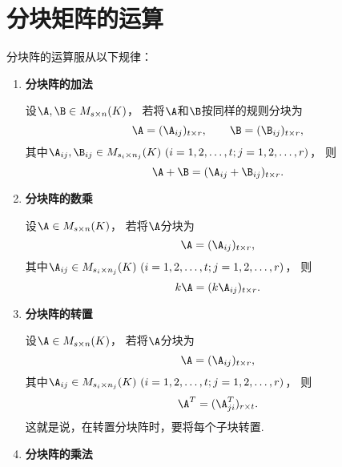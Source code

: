 \section{分块矩阵的运算}
分块阵的运算服从以下规律：
\begin{enumerate}
	\item {\rm\bf 分块阵的加法}

	设\(\A,\B \in M_{s \times n}(K)\)，
	若将\(\A\)和\(\B\)按同样的规则分块为\[
		\A=(\A_{ij})_{t \times r}, \qquad
		\B=(\B_{ij})_{t \times r},
	\]
	其中\(\A_{ij},\B_{ij}\in M_{s_i \times n_j}(K)\ (i=1,2,\dotsc,t;j=1,2,\dotsc,r)\)，
	则\[
		\A+\B=(\A_{ij}+\B_{ij})_{t \times r}.
	\]

	\item {\rm\bf 分块阵的数乘}

	设\(\A\in M_{s \times n}(K)\)，
	若将\(\A\)分块为\[
		\A=(\A_{ij})_{t \times r},
	\]
	其中\(\A_{ij}\in M_{s_i \times n_j}(K)\ (i=1,2,\dotsc,t;j=1,2,\dotsc,r)\)，
	则\[
		k\A=(k\A_{ij})_{t \times r}.
	\]

	\item {\rm\bf 分块阵的转置}

	设\(\A\in M_{s \times n}(K)\)，
	若将\(\A\)分块为\[
		\A=(\A_{ij})_{t \times r},
	\]
	其中\(\A_{ij}\in M_{s_i \times n_j}(K)\ (i=1,2,\dotsc,t;j=1,2,\dotsc,r)\)，
	则\[
		\A^T=(\A_{ji}^T)_{r \times t}.
	\]
	这就是说，在转置分块阵时，要将每个子块转置.

	\item {\rm\bf 分块阵的乘法}


\end{enumerate}
